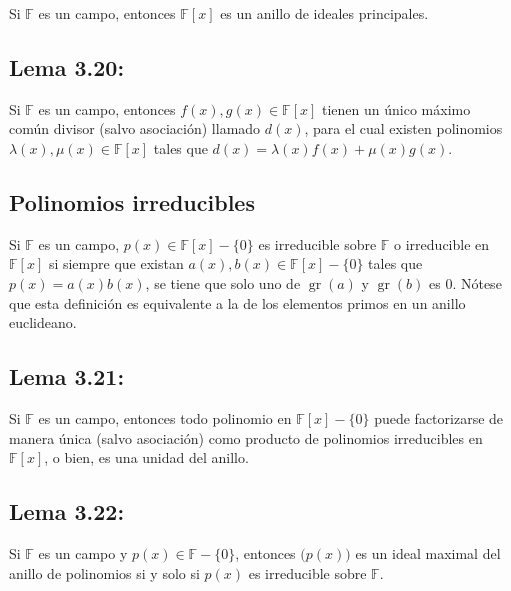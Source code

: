 \documentclass{article}
\DeclareMathOperator{\gr}{gr}
\begin{document}
Si $\mathbb{F}$ es un campo, entonces $\mathbb{F}[x]$ es un anillo de ideales principales.

\subsection*{\color{blue} Lema 3.20:}

Si $\mathbb{F}$ es un campo, entonces $f(x),g(x)\in\mathbb{F}[x]$ tienen un único máximo común divisor (salvo asociación) llamado $d(x)$, para el cual existen polinomios $\lambda(x),\mu(x)\in\mathbb{F}[x]$ tales que $d(x)=\lambda(x)f(x)+\mu(x)g(x)$.

\subsection*{\color{violet} Polinomios irreducibles}

Si $\mathbb{F}$ es un campo, $p(x)\in\mathbb{F}[x]-\{0\}$ es irreducible sobre $\mathbb{F}$ o irreducible en $\mathbb{F}[x]$ si siempre que existan $a(x),b(x)\in\mathbb{F}[x]-\{0\}$ tales que $p(x)=a(x)b(x)$, se tiene que solo uno de $\gr(a)$ y $\gr(b)$ es 0. Nótese que esta definición es equivalente a la de los elementos primos en un anillo euclideano.

\subsection*{\color{blue} Lema 3.21:}

Si $\mathbb{F}$ es un campo, entonces todo polinomio en $\mathbb{F}[x]-\{0\}$ puede factorizarse de manera única (salvo asociación) como producto de polinomios irreducibles en $\mathbb{F}[x]$, o bien, es una unidad del anillo.

\subsection*{\color{blue} Lema 3.22:}

Si $\mathbb{F}$ es un campo y $p(x)\in\mathbb{F}-\{0\}$, entonces $\big(p(x)\big)$ es un ideal maximal del anillo de polinomios si y solo si $p(x)$ es irreducible sobre $\mathbb{F}$.


\end{document}
